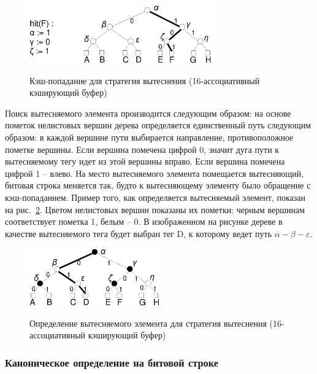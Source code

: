 \begin{figure}[h] \center
  \includegraphics[width=0.7\textwidth]{2.theor/plruhit}\\
  \caption{Кэш-попадание для стратегия вытеснения \PseudoLRU
  (16-ассоциативный кэширующий буфер)}\label{pseudo_lru_hit}
\end{figure}

Поиск вытесняемого элемента производится следующим образом: на
основе пометок нелистовых вершин дерева определяется единственный
путь следующим образом: в каждой вершине пути выбирается
направление, противоположное пометке вершины. Если вершина помечена
цифрой 0, значит дуга пути к вытесняемому тегу идет из этой вершины
вправо. Если вершина помечена цифрой 1 -- влево. На место
вытесняемого элемента помещается вытесняющий, битовая строка
меняется так, будто к вытесняющему элементу было обращение с
кэш-попаданием. Пример того, как определяется вытесняемый элемент,
показан на рис.~\ref{pseudo_lru_miss}. Цветом нелистовых вершин
показаны их пометки: черным вершинам соответствует пометка 1, белым
-- 0. В изображенном на рисунке дереве в качестве вытесняемого тега
будет выбран тег D, к которому ведет путь
$\alpha-\beta-\varepsilon$.

\begin{figure}[h] \center
  \includegraphics[width=0.5\textwidth]{2.theor/plrumiss}\\
  \caption{Определение вытесняемого элемента для стратегия вытеснения
  \PseudoLRU (16-ассоциативный кэширующий буфер)}\label{pseudo_lru_miss}
\end{figure}


\subsubsection{Каноническое определение \PseudoLRU на битовой строке}

